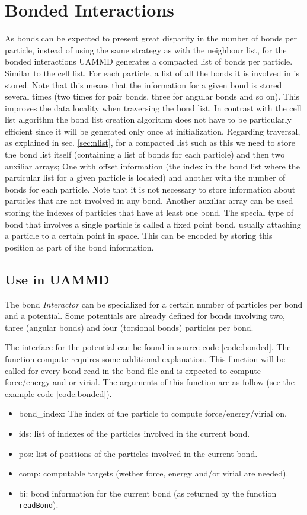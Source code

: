 \documentclass[ twoside,openright,titlepage,numbers=noenddot,%
headinclude,footinclude,cleardoublepage=empty,abstract=on,
BCOR=5mm,paper=a4,fontsize=11pt, dvipsnames
]{scrreprt}
\def\ucpp{uammd_cpp_lexer.py:UAMMDCppLexer -x}
\newcommand{\uammd}{\gls{UAMMD}\xspace}
\begin{document}
\chapter{Bonded Interactions}\label{sec:bonded}

As bonds can be expected to present great disparity in the number of bonds per particle, instead of using the same strategy as with the neighbour list, for the bonded interactions \uammd generates a compacted list of bonds per particle. Similar to the cell list.
For each particle, a list of all the bonds it is involved in is stored. Note that this means that the information for a given bond is stored several times (two times for pair bonds, three for angular bonds and so on).
This improves the data locality when traversing the bond list.
In contrast with the cell list algorithm the bond list creation algorithm does not have to be particularly efficient since it will be generated only once at initialization.
Regarding traversal, as explained in sec. \ref{sec:nlist}, for a compacted list such as this we need to store the bond list itself (containing a list of bonds for each particle) and then two auxiliar arrays; One with offset information (the index in the bond list where the particular list for a given particle is located) and another with the number of bonds for each particle.
Note that it is not necessary to store information about particles that are not involved in any bond. Another auxiliar array can be used storing the indexes of particles that have at least one bond.
The special type of bond that involves a single particle is called a fixed point bond, usually attaching a particle to a certain point in space. This can be encoded by storing this position as part of the bond information.


\section*{Use in UAMMD}
The bond \emph{Interactor} can be specialized for a certain number of particles per bond and a potential. Some potentials are already defined for bonds involving two, three (angular bonds) and four (torsional bonds) particles per bond.

The interface for the potential can be found in source code \ref{code:bonded}. The function compute requires some additional explanation. This function will be called for every bond read in the bond file and is expected to compute force/energy and or virial. The arguments of this function are as follow (see the example code \ref{code:bonded}).
\begin{itemize}
\item bond\_index: The index of the particle to compute force/energy/virial on.
\item ids: list of indexes of the particles involved in the current bond.
\item pos: list of positions of the particles involved in the current bond.
\item comp: computable targets (wether force, energy and/or virial are needed).
\item bi: bond information for the current bond (as returned by the function \texttt{readBond}).
\end{itemize}
\end{document}
